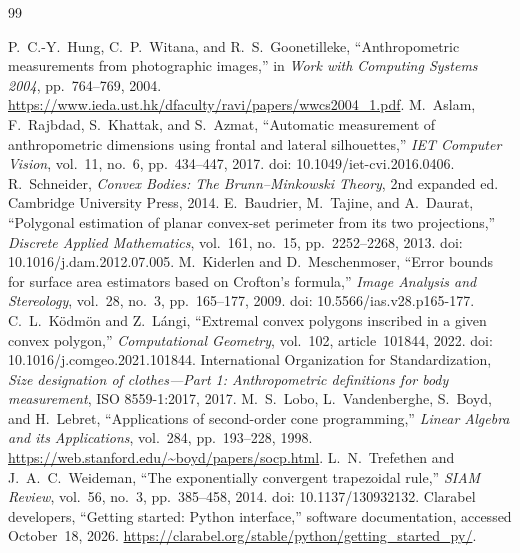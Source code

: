 \documentclass[11pt,a4paper]{article}
\begin{document}
\begin{thebibliography}{99}
\small\raggedright\setlength{\itemsep}{0.15em}
 P.~C.-Y.~Hung, C.~P.~Witana, and R.~S.~Goonetilleke, ``Anthropometric measurements from photographic images,'' in \emph{Work with Computing Systems 2004}, pp.~764--769, 2004. \url{https://www.ieda.ust.hk/dfaculty/ravi/papers/wwcs2004_1.pdf}.
 M.~Aslam, F.~Rajbdad, S.~Khattak, and S.~Azmat, ``Automatic measurement of anthropometric dimensions using frontal and lateral silhouettes,'' \emph{IET Computer Vision}, vol.~11, no.~6, pp.~434--447, 2017. doi: 10.1049/iet-cvi.2016.0406.
 R.~Schneider, \emph{Convex Bodies: The Brunn--Minkowski Theory}, 2nd expanded ed. Cambridge University Press, 2014.
 E.~Baudrier, M.~Tajine, and A.~Daurat, ``Polygonal estimation of planar convex-set perimeter from its two projections,'' \emph{Discrete Applied Mathematics}, vol.~161, no.~15, pp.~2252--2268, 2013. doi: 10.1016/j.dam.2012.07.005.
 M.~Kiderlen and D.~Meschenmoser, ``Error bounds for surface area estimators based on Crofton's formula,'' \emph{Image Analysis and Stereology}, vol.~28, no.~3, pp.~165--177, 2009. doi: 10.5566/ias.v28.p165-177.
 C.~L.~K\"odm\"on and Z.~L\'angi, ``Extremal convex polygons inscribed in a given convex polygon,'' \emph{Computational Geometry}, vol.~102, article~101844, 2022. doi: 10.1016/j.comgeo.2021.101844.
 International Organization for Standardization, \emph{Size designation of clothes---Part 1: Anthropometric definitions for body measurement}, ISO 8559-1:2017, 2017.
 M.~S.~Lobo, L.~Vandenberghe, S.~Boyd, and H.~Lebret, ``Applications of second-order cone programming,'' \emph{Linear Algebra and its Applications}, vol.~284, pp.~193--228, 1998. \url{https://web.stanford.edu/~boyd/papers/socp.html}.
 L.~N.~Trefethen and J.~A.~C.~Weideman, ``The exponentially convergent trapezoidal rule,'' \emph{SIAM Review}, vol.~56, no.~3, pp.~385--458, 2014. doi: 10.1137/130932132.
 Clarabel developers, ``Getting started: Python interface,'' software documentation, accessed October~18, 2026. \url{https://clarabel.org/stable/python/getting_started_py/}.
\end{thebibliography}
\end{document}
